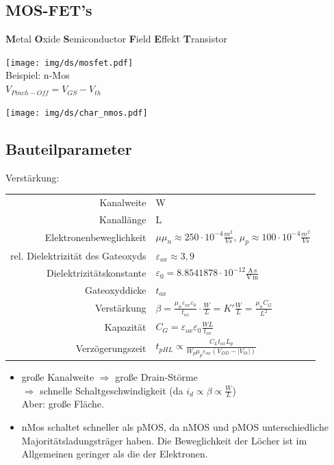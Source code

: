\documentclass[6pt,a4paper]{scrartcl}
\newcommand{\Ra}[0]{\ensuremath{\Rightarrow}}									%
\begin{document}
\begin{multicols*}{3}
\section{MOS-FET's}
\textbf{M}etal \textbf{O}xide \textbf{S}emiconductor \textbf{F}ield \textbf{E}ffekt \textbf{T}ransistor\\
\parbox{4.0cm}{ \texttt{[image: img/ds/mosfet.pdf]} \\ Beispiel: n-Mos \\ $V_{Pinch-Off} = V_{GS} - V_{th}$} \parbox{3.0cm}{ \texttt{[image: img/ds/char\_nmos.pdf]} } 


	\subsection{Bauteilparameter}
	Verstärkung:  \\
	\begin{tabular} {r | l}
		Kanalweite & W  \\
		Kanallänge & L  \\
		Elektronenbeweglichkeit & $\mu$\quad $\mu_n \approx 250 \cdot 10^{-4} \frac{m^2}{Vs}$, $\mu_p \approx 100 \cdot 10^{-4} \frac{m^2}{Vs}$ \\
		rel. Dielektrizität des Gateoxyds & $\varepsilon_{ox} \approx 3,9$ \\
		Dielektrizitätskonstante & $\varepsilon_0 = 8.8541878 \cdot 10^{-12} \frac{\mathrm{A\,s}}{\mathrm{V\,m}}$ \\
		Gateoxyddicke & $t_{ox}$ \\
		Verstärkung & $\beta = \frac{\mu_n \varepsilon_{ox} \varepsilon_0}{t_{ox}} \cdot \frac{W}{L} = K' \frac{W}{L} = \frac{\mu_n C_G}{L^2}$ \\
		Kapazität & $C_G = \varepsilon_{ox} \varepsilon_0 \frac{WL}{t_{ox}}$ \\
		Verzögerungszeit & $t_{pHL} \propto \frac{C_L t_{ox} L_p}{W_p \mu_p \varepsilon_{ox} (V_{DD} - |V_{th}|)}$ \\
	\end{tabular}
	\begin{itemize}
		\item große Kanalweite $\Ra$ große Drain-Störme \\ $\Ra$ schnelle Schaltgeschwindigkeit (da $i_d \propto \beta \propto \frac{W}{L}$) \\
		Aber: große Fläche.
		\item nMos schaltet schneller als pMOS, da nMOS und pMOS unterschiedliche Majoritätsladungsträger haben. Die Beweglichkeit der Löcher ist im Allgemeinen geringer als die der Elektronen. 
	\end{itemize}
	\begin{minipage}{\columnwidth}

\end{minipage}
\end{multicols*}
\end{document}

